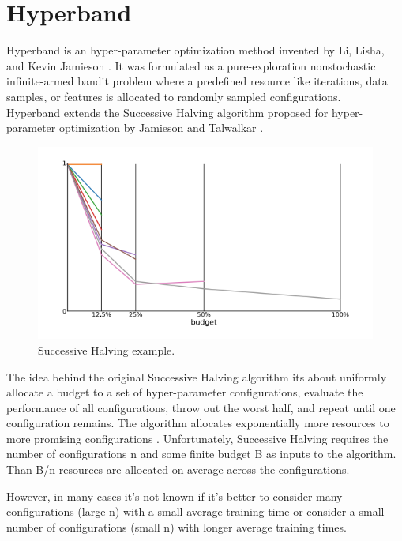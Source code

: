 \newpage
\section{Hyperband}
Hyperband is an hyper-parameter optimization method invented by Li, Lisha, and Kevin Jamieson \cite{li2016novel}.
It was formulated as a pure-exploration nonstochastic infinite-armed bandit problem where a predefined resource like iterations, data samples, or features is allocated to randomly sampled configurations.\\

Hyperband extends the Successive Halving algorithm proposed for hyper-parameter optimization by Jamieson and Talwalkar \cite{jamieson2016non}. 

\begin{figure}[ht]
\centering
\includegraphics[scale=0.6]{images/Successive Halving.png}
\caption{Successive Halving example.}
\label{fig:Successive_Halving}
\end{figure}

The idea behind the original Successive Halving algorithm its about uniformly
allocate a budget to a set of hyper-parameter configurations, evaluate the performance of
all configurations, throw out the worst half, and repeat until one configuration remains.
The algorithm allocates exponentially more resources to more promising configurations \cite{li2016novel}\cite{jamieson2016non}.
Unfortunately, Successive Halving requires the number of configurations n and some finite budget B as inputs
to the algorithm. Than B/n resources are allocated on average across the configurations. 

However, in many cases it's not known if it's better to consider many configurations (large n) with a small average training time or consider a small number of configurations (small n) with longer average training times. \\ 

